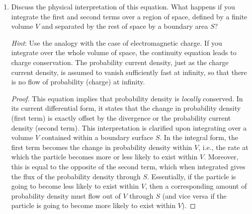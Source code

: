 \documentclass[../psets.tex]{subfiles}
\begin{document}
\begin{enumerate}
\begin{enumerate}
\begin{proof}
\begin{align*}
                &= \psi^*\pdv{\psi}{t}+\psi\pdv{\psi^*}{t}\\
                &= \psi^*\left( \frac{i\hbar}{2m}\vec{\nabla}^2-\frac{i}{\hbar}V \right)\psi+\psi\left( -\frac{i\hbar}{2m}\vec{\nabla}^2+\frac{i}{\hbar}V \right)\psi^*\\
                &= \frac{i\hbar}{2m}\left( \psi^*\vec{\nabla}^2\psi-\psi\vec{\nabla}^2\psi^* \right)\\
                &= \frac{i\hbar}{2m}\left[ \left( \vec{\nabla}\psi^*\vec{\nabla}\psi+\psi^*\vec{\nabla}^2\psi \right)-\left( \vec{\nabla}\psi\vec{\nabla}\psi^*+\psi\vec{\nabla}^2\psi^* \right) \right]\\
                &= \frac{i\hbar}{2m}\vec{\nabla}\left( \psi^*\vec{\nabla}\psi-\psi\vec{\nabla}\psi^* \right)\\
                &= -\vec{\nabla}\left( \frac{i\hbar}{2m} \right)\left( \psi\vec{\nabla}\psi^*-\psi^*\vec{\nabla}\psi \right)
            \end{align*}
        \end{proof}
        \item Discuss the physical interpretation of this equation. What happens if you integrate the first and second terms over a region of space, defined by a finite volume $V$ and separated by the rest of space by a boundary area $S$?\par
        \emph{Hint}: Use the analogy with the case of electromagnetic charge. If you integrate over the whole volume of space, the continuity equation leads to charge conservation. The probability current density, just as the charge current density, is assumed to vanish sufficiently fast at infinity, so that there is no ﬂow of probability (charge) at infinity.
        \begin{proof}
            This equation implies that probability density is \emph{locally} conserved. In its current differential form, it states that the change in probability density (first term) is exactly offset by the divergence or the probability current density (second term). This interpretation is clarified upon integrating over a volume $V$ contained within a boundary surface $S$. In the integral form, the first term becomes the change in probability density within $V$, i.e., the rate at which the particle becomes more or less likely to exist within $V$. Moreover, this is equal to the opposite of the second term, which when integrated gives the flux of the probability density through $S$. Essentially, if the particle is going to become less likely to exist within $V$, then a corresponding amount of probability density must flow out of $V$ through $S$ (and vice versa if the particle is going to become more likely to exist within $V$).\par

\end{proof}
\end{enumerate}
\end{enumerate}
\end{document}
